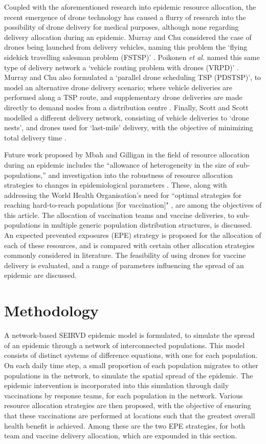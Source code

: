 \documentclass[10pt,letterpaper]{article}
\begin{document}
Coupled with the aforementioned research into epidemic resource allocation, the recent emergence of drone technology has caused a flurry of research into the possibility of drone delivery for medical purposes, although none regarding delivery allocation during an epidemic.
Murray and Chu considered the case of drones being launched from delivery vehicles, naming this problem the `flying sidekick travelling salesman problem (FSTSP)' \cite{murray2015flying}. Poikonen \textit{et al.} named this same type of delivery network a `vehicle routing problem with drones (VRPD)' \cite{poikonen2017vehicle}.
Murray and Chu also formulated a `parallel drone scheduling TSP (PDSTSP)', to model an alternative drone delivery scenario; where vehicle deliveries are performed along a TSP route, and supplementary drone deliveries are made directly to demand nodes from a distribution centre \cite{murray2015flying}.
Finally, Scott and Scott modelled a different delivery network, consisting of vehicle deliveries to `drone nests', and drones used for `last-mile' delivery, with the objective of minimizing total delivery time \cite{scott2017drone}. 

Future work proposed by Mbah and Gilligan in the field of resource allocation during an epidemic includes the ``allowance of heterogeneity in the size of sub-populations,'' and investigation into the robustness of resource allocation strategies to changes in epidemiological parameters \cite{mbah2011resource}. These, along with addressing the World Health Organisation's need for ``optimal strategies for reaching hard-to-reach populations [for vaccination]" \cite{world2017measles}, are among the objectives of this article. 
The allocation of vaccination teams and vaccine deliveries, to sub-populations in multiple generic population distribution structures, is discussed. An expected prevented exposures (EPE) strategy is proposed for the allocation of each of these resources, and is compared with certain other allocation strategies commonly considered in literature. The feasibility of using drones for vaccine delivery is evaluated, and a range of parameters influencing the spread of an epidemic are discussed.

\section*{Methodology}
A network-based SEIRVD epidemic model is formulated, to simulate the spread of an epidemic through a network of interconnected populations. This model consists of distinct systems of difference equations, with one for each population. On each daily time step, a small proportion of each population migrates to other populations in the network, to simulate the spatial spread of the epidemic. The epidemic intervention is incorporated into this simulation through daily vaccinations by response teams, for each population in the network. Various resource allocation strategies are then proposed, with the objective of ensuring that these vaccinations are performed at locations such that the greatest overall health benefit is achieved. Among these are the two EPE strategies, for both team and vaccine delivery allocation, which are expounded in this section.
\end{document}
